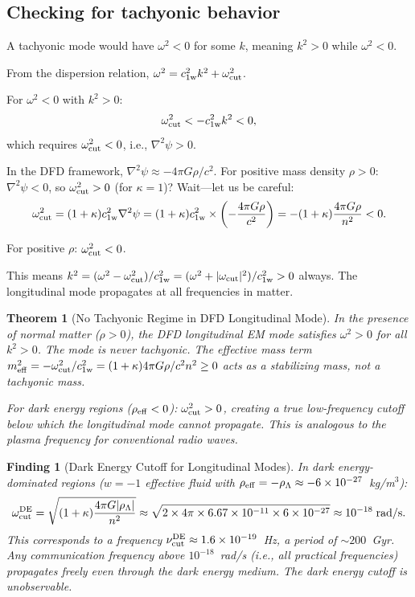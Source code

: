 \documentclass[11pt]{article}
\newtheorem{theorem}{Theorem}
\newtheorem{finding}{Finding}
\newcommand{\ee}[1]{\times 10^{#1}}
\newcommand{\cfield}{c_{1\mathrm{w}}}
\begin{document}
\subsection{Checking for tachyonic behavior}

A tachyonic mode would have $\omega^2 < 0$ for some $k$, meaning
$k^2 > 0$ while $\omega^2 < 0$.

From the dispersion relation, $\omega^2 = \cfield^2 k^2 + \omega_{\rm cut}^2$.

For $\omega^2 < 0$ with $k^2 > 0$:
\begin{equation}
\omega_{\rm cut}^2 < -\cfield^2 k^2 < 0,
\end{equation}
which requires $\omega_{\rm cut}^2 < 0$, i.e., $\nabla^2\psi > 0$.

In the DFD framework, $\nabla^2\psi \approx -4\pi G\rho/c^2$.
For positive mass density $\rho > 0$: $\nabla^2\psi < 0$,
so $\omega_{\rm cut}^2 > 0$ (for $\kappa = 1$)? Wait---let us
be careful:
\begin{equation}
\omega_{\rm cut}^2 = (1+\kappa)\cfield^2\nabla^2\psi
= (1+\kappa)\cfield^2 \times \left(-\frac{4\pi G\rho}{c^2}\right)
= -(1+\kappa)\frac{4\pi G\rho}{n^2} < 0.
\end{equation}

For positive $\rho$: $\omega_{\rm cut}^2 < 0$.

This means $k^2 = (\omega^2 - \omega_{\rm cut}^2)/\cfield^2
= (\omega^2 + |\omega_{\rm cut}|^2)/\cfield^2 > 0$ always.
The longitudinal mode propagates at all frequencies in matter.

\begin{theorem}[No Tachyonic Regime in DFD Longitudinal Mode]
In the presence of normal matter ($\rho > 0$), the DFD longitudinal
EM mode satisfies $\omega^2 > 0$ for all $k^2 > 0$. The mode is
never tachyonic. The effective mass term $m_{\rm eff}^2 = -\omega_{\rm cut}^2/\cfield^2
= (1+\kappa)4\pi G\rho/c^2 n^2 \geq 0$ acts as a \textit{stabilizing mass},
not a tachyonic mass.

For dark energy regions ($\rho_{\rm eff} < 0$): $\omega_{\rm cut}^2 > 0$,
creating a true low-frequency cutoff below which the longitudinal
mode cannot propagate. This is analogous to the plasma frequency
for conventional radio waves.
\end{theorem}

\begin{finding}[Dark Energy Cutoff for Longitudinal Modes]
In dark energy-dominated regions ($w = -1$ effective fluid with
$\rho_{\rm eff} = -\rho_\Lambda \approx -6\ee{-27}$~kg/m$^3$):
\begin{equation}
\omega_{\rm cut}^{\rm DE} = \sqrt{(1+\kappa)\frac{4\pi G|\rho_\Lambda|}{n^2}}
\approx \sqrt{2 \times 4\pi \times 6.67\ee{-11} \times 6\ee{-27}}
\approx 10^{-18}\;\text{rad/s}.
\end{equation}
This corresponds to a frequency $\nu_{\rm cut}^{\rm DE} \approx 1.6\ee{-19}$~Hz,
a period of $\sim 200$~Gyr. Any communication frequency above $10^{-18}$~rad/s
(i.e., all practical frequencies) propagates freely even through
the dark energy medium. The dark energy cutoff is unobservable.
\end{finding}
\end{document}
